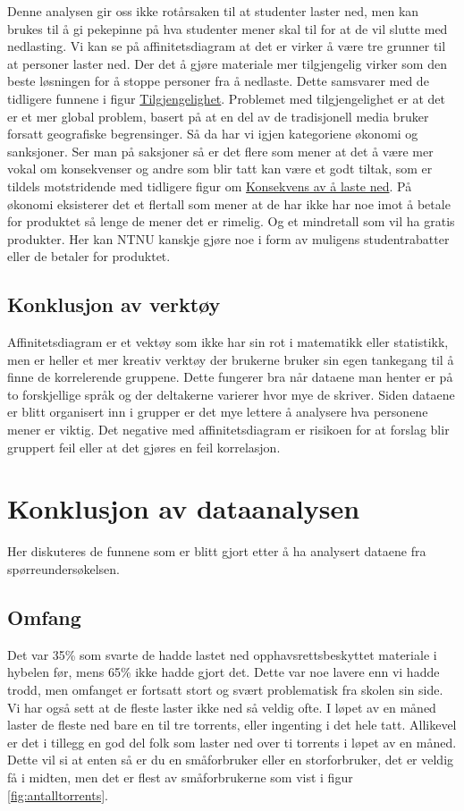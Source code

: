 Denne analysen gir oss ikke rotårsaken til at studenter laster ned, men kan brukes til å gi pekepinne på hva studenter mener skal til for at de vil slutte med nedlasting. Vi kan se på affinitetsdiagram at det er virker å være tre grunner til at personer laster ned. Der det å gjøre materiale mer tilgjengelig virker som den beste løsningen for å stoppe personer fra å nedlaste. Dette samsvarer med de tidligere funnene i figur \hyperref[fig:tilgjengelighet]{Tilgjengelighet}. Problemet med tilgjengelighet er at det er et mer global problem, basert på at en del av de tradisjonell media bruker forsatt geografiske begrensinger. Så da har vi igjen kategoriene økonomi og sanksjoner. Ser man på saksjoner så er det flere som mener at det å være mer vokal om konsekvenser og andre som blir tatt kan være et godt tiltak, som er tildels motstridende med tidligere figur om \hyperref[fig:konsekvens_lasterned]{Konsekvens av å laste ned}. På økonomi eksisterer det et flertall som mener at de har ikke har noe imot å betale for produktet så lenge de mener det er rimelig. Og et mindretall som vil ha gratis produkter. Her kan NTNU kanskje gjøre noe i form av muligens studentrabatter eller de betaler for produktet.          


\subsection{Konklusjon av verktøy}
Affinitetsdiagram er et vektøy som ikke har sin rot i matematikk eller statistikk, men er heller et mer kreativ verktøy der brukerne bruker sin egen tankegang til å finne de korrelerende gruppene. Dette fungerer bra når dataene man henter er på to forskjellige språk og der deltakerne varierer hvor mye de skriver. Siden dataene er blitt organisert inn i grupper er det mye lettere å analysere hva personene mener er viktig. Det negative med affinitetsdiagram er risikoen for at forslag blir gruppert feil eller at det gjøres en feil korrelasjon.        
  

\section{Konklusjon av dataanalysen}
Her diskuteres de funnene som er blitt gjort etter å ha analysert dataene fra spørreundersøkelsen. 

\subsection{Omfang}
Det var 35\% som svarte de hadde lastet ned opphavsrettsbeskyttet materiale i hybelen før, mens 65\% ikke hadde gjort det. Dette var noe lavere enn vi hadde trodd, men omfanget er fortsatt stort og svært problematisk fra skolen sin side. Vi har også sett at de fleste laster ikke ned så veldig ofte. I løpet av en måned laster de fleste ned bare en til tre torrents, eller ingenting i det hele tatt. Allikevel er det i tillegg en god del folk som laster ned over ti torrents i løpet av en måned. Dette vil si at enten så er du en småforbruker eller en storforbruker, det er veldig få i midten, men det er flest av småforbrukerne som vist i figur \ref{fig:antalltorrents}.

